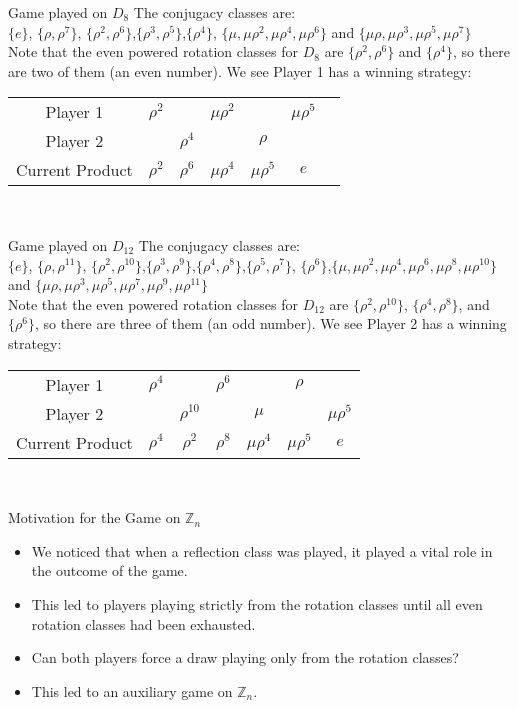 \documentclass{beamer}
\begin{document}
\begin{frame}{Game played on $D_{8}$}
    The conjugacy classes are:\\ $\{e\}$, $\{\rho,\rho^{7}\}$, $\{\rho^2,\rho^{6}\}$,$\{\rho^3,\rho^5\}$,$\{\rho^4\}$, $\{\mu, \mu\rho^2, \mu\rho^4, \mu\rho^6\}$ and $\{\mu\rho, \mu\rho^3, \mu\rho^5, \mu\rho^7\}$\\
    \bigskip
    Note that the even powered rotation classes for $D_8$ are $\{\rho^{2}, \rho^{6}\}$ and $\{\rho^4\}$, so there are two of them (an even number). We see Player 1 has a winning strategy:\\
    \bigskip
    \begin{tabular}{c|cccccc}
    \hline
        Player 1 & {$\rho^2$} & & {$\mu\rho^2$} & & {$\mu\rho^5$}\\
        Player 2 & & {$\rho^4$} & & {$\rho$} \\
    \hline 
        Current Product & {$\rho^2$} & {$\rho^6$} & {$\mu\rho^4$} & {$\mu\rho^5$} & {$e$}
    \end{tabular}\\
\end{frame}

\begin{frame}{Game played on $D_{12}$}
    The conjugacy classes are:\\ $\{e\}$, $\{\rho,\rho^{11}\}$, $\{\rho^2,\rho^{10}\}$,$\{\rho^3,\rho^9\}$,$\{\rho^4,\rho^8\}$,$\{\rho^5,\rho^7\}$, $\{\rho^6\}$,$\{\mu, \mu\rho^2, \mu\rho^4, \mu\rho^6, \mu\rho^8, \mu\rho^{10}\}$ and $\{\mu\rho, \mu\rho^3, \mu\rho^5, \mu\rho^7, \mu\rho^9, \mu\rho^{11}\}$\\
    \bigskip
    Note that the even powered rotation classes for $D_{12}$ are $\{\rho^2,\rho^{10}\}$, $\{\rho^4,\rho^8\}$, and $\{\rho^6\}$, so there are three of them (an odd number). We see Player 2 has a winning strategy: \\
    \bigskip
    \begin{tabular}{c|cccccc}
    \hline
        Player 1 & {$\rho^4$} & & {$\rho^6$} & & {$\rho$}\\
        Player 2 & & {$\rho^{10}$} & & {$\mu$} & & {$\mu\rho^5$}\\
    \hline 
        Current Product & {$\rho^4$} & {$\rho^2$} & {$\rho^8$} & {$\mu\rho^4$} & {$\mu\rho^5$} & {$e$}
    \end{tabular}\\
\end{frame}

\begin{frame}{Motivation for the Game on $\mathbb{Z}_n$}
\begin{itemize}
\item We noticed that when a reflection class was played, it played a vital role in the outcome of the game.
\medskip
\item This led to players playing strictly from the rotation classes until all even rotation classes had been exhausted. 
\medskip
\item Can both players force a draw playing only from the rotation classes?
\medskip
\item This led to an auxiliary game on $\mathbb{Z}_n$.
\end{itemize}
\end{frame}
\end{document}

